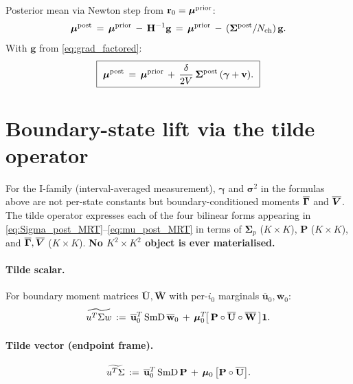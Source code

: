 \documentclass[11pt]{article}
\begin{document}
Posterior mean via Newton step from $\mathbf{r}_0 = \boldsymbol{\mu}^{\mathrm{prior}}$:
\begin{equation}
  \boldsymbol{\mu}^{\mathrm{post}}
  \,=\,
  \boldsymbol{\mu}^{\mathrm{prior}} \,-\, \mathbf{H}^{-1}\mathbf{g}
  \,=\,
  \boldsymbol{\mu}^{\mathrm{prior}} \,-\, (\boldsymbol{\Sigma}^{\mathrm{post}}/N_{\mathrm{ch}})\,\mathbf{g}.
\end{equation}
With $\mathbf{g}$ from \eqref{eq:grad_factored}:
\begin{equation}
  \boxed{\
  \boldsymbol{\mu}^{\mathrm{post}}
  \,=\,
  \boldsymbol{\mu}^{\mathrm{prior}} \,+\, \frac{\delta}{2V}\,\boldsymbol{\Sigma}^{\mathrm{post}}\,(\boldsymbol{\gamma} + \mathbf{v}).
  \ }
  \label{eq:mu_post_MRT}
\end{equation}

\section{Boundary-state lift via the tilde operator}
\label{sec:boundary-lift}

For the I-family (interval-averaged measurement), $\boldsymbol{\gamma}$ and
$\boldsymbol{\sigma}^2$ in the formulas above are not per-state constants but
boundary-conditioned moments $\overline{\boldsymbol{\Gamma}}$ and $\overline{\boldsymbol{V}}$. The tilde operator
expresses each of the four bilinear forms appearing in
\eqref{eq:Sigma_post_MRT}--\eqref{eq:mu_post_MRT} in terms of
$\boldsymbol{\Sigma}_p$ ($K\!\times\! K$), $\mathbf{P}$ ($K\!\times\! K$), and
$\overline{\boldsymbol{\Gamma}},\overline{\boldsymbol{V}}$ ($K\!\times\! K$). \textbf{No $K^2\!\times\! K^2$ object is
ever materialised.}

\paragraph{Tilde scalar.}
For boundary moment matrices $\overline{\mathbf{U}},\overline{\mathbf{W}}$ with
per-$i_0$ marginals $\overline{\mathbf{u}}_0,\overline{\mathbf{w}}_0$:
\begin{equation}
  \widetilde{u^{T}\Sigma w}
  \,:=\,
  \overline{\mathbf{u}}_0^{T}\,\mathrm{SmD}\,\overline{\mathbf{w}}_0
  \,+\,
  \boldsymbol{\mu}_0^{T}\!\bigl[\,\mathbf{P}\circ\overline{\mathbf{U}}\circ\overline{\mathbf{W}}\,\bigr]\mathbf{1}.
\end{equation}

\paragraph{Tilde vector (endpoint frame).}
\begin{equation}
  \widetilde{u^{T}\Sigma}
  \,:=\,
  \overline{\mathbf{u}}_0^{T}\,\mathrm{SmD}\,\mathbf{P}
  \,+\,
  \boldsymbol{\mu}_0\,\bigl[\mathbf{P}\circ\overline{\mathbf{U}}\bigr].
\end{equation}
\end{document}
